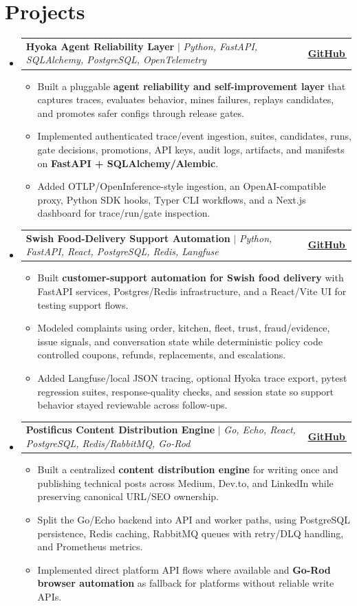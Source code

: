 \documentclass[letterpaper,11pt]{article}
\makeatletter
\newcommand{\bodyhref}[2]{\href{#1}{\underline{#2}\,\faExternalLink*}}
\newcommand{\resumeItem}[1]{\item{\fontsize{8.82pt}{9.28pt}\selectfont #1\vspace{-0.7pt}}}
\newcommand{\resumeProjectHeading}[2]{
    \item
    \begin{tabular*}{1.0\textwidth}{l@{\extracolsep{\fill}}r}
      \small#1 & \textbf{\small #2}\\
    \end{tabular*}\vspace{-4pt}
}
\newcommand{\resumeSubHeadingListStart}{\begin{itemize}[leftmargin=0.0in, label={}, itemsep=0.6pt, topsep=0pt, parsep=0pt, partopsep=0pt]}
\newcommand{\resumeSubHeadingListEnd}{\end{itemize}}
\newcommand{\resumeItemListStart}{\begin{itemize}[leftmargin=0.16in,itemsep=0.3pt,topsep=0.9pt,parsep=0pt,partopsep=0pt]}
\newcommand{\resumeItemListEnd}{\end{itemize}\vspace{-3pt}}
\makeatother
\begin{document}
\section{Projects}
\resumeSubHeadingListStart
\resumeProjectHeading
{\textbf{Hyoka Agent Reliability Layer} $|$ \emph{Python, FastAPI, SQLAlchemy, PostgreSQL, OpenTelemetry}}{\bodyhref{https://github.com/unichronic/hyoka}{GitHub}}
\resumeItemListStart
\resumeItem{Built a pluggable \textbf{agent reliability and self-improvement layer} that captures traces, evaluates behavior, mines failures, replays candidates, and promotes safer configs through release gates.}
\resumeItem{Implemented authenticated trace/event ingestion, suites, candidates, runs, gate decisions, promotions, API keys, audit logs, artifacts, and manifests on \textbf{FastAPI + SQLAlchemy/Alembic}.}
\resumeItem{Added OTLP/OpenInference-style ingestion, an OpenAI-compatible proxy, Python SDK hooks, Typer CLI workflows, and a Next.js dashboard for trace/run/gate inspection.}
\resumeItemListEnd
\resumeProjectHeading
{\textbf{Swish Food-Delivery Support Automation} $|$ \emph{Python, FastAPI, React, PostgreSQL, Redis, Langfuse}}{\bodyhref{https://github.com/unichronic/swishagent}{GitHub}}
\resumeItemListStart
\resumeItem{Built \textbf{customer-support automation for Swish food delivery} with FastAPI services, Postgres/Redis infrastructure, and a React/Vite UI for testing support flows.}
\resumeItem{Modeled complaints using order, kitchen, fleet, trust, fraud/evidence, issue signals, and conversation state while deterministic policy code controlled coupons, refunds, replacements, and escalations.}
\resumeItem{Added Langfuse/local JSON tracing, optional Hyoka trace export, pytest regression suites, response-quality checks, and session state so support behavior stayed reviewable across follow-ups.}
\resumeItemListEnd
\resumeProjectHeading
{\textbf{Postificus Content Distribution Engine} $|$ \emph{Go, Echo, React, PostgreSQL, Redis/RabbitMQ, Go-Rod}}{\bodyhref{https://github.com/unichronic/postificus}{GitHub}}
\resumeItemListStart
\resumeItem{Built a centralized \textbf{content distribution engine} for writing once and publishing technical posts across Medium, Dev.to, and LinkedIn while preserving canonical URL/SEO ownership.}
\resumeItem{Split the Go/Echo backend into API and worker paths, using PostgreSQL persistence, Redis caching, RabbitMQ queues with retry/DLQ handling, and Prometheus metrics.}
\resumeItem{Implemented direct platform API flows where available and \textbf{Go-Rod browser automation} as fallback for platforms without reliable write APIs.}
\resumeItemListEnd
\resumeSubHeadingListEnd
\end{document}
